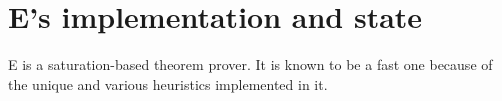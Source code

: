 \section{E's implementation and state} \label{sec:c2s2}
E is a saturation-based theorem prover. It is known to be a fast one because of the unique and various heuristics implemented in it.  